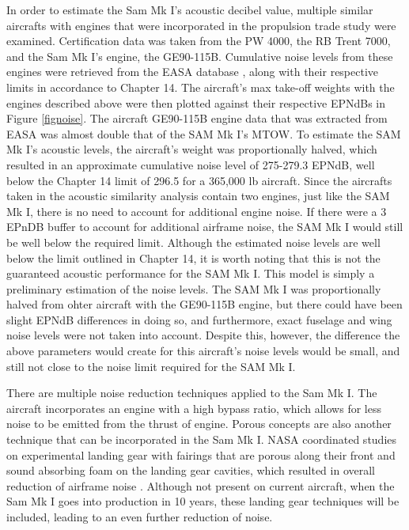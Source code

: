 In order to estimate the Sam Mk I's acoustic decibel value, multiple similar aircrafts with engines that were incorporated in the propulsion trade study were examined. Certification data was taken from the PW 4000, the RB Trent 7000, and the Sam Mk I's engine, the GE90-115B. Cumulative noise levels from these engines were retrieved from the EASA database \cite{easa}, along with their respective limits in accordance to Chapter 14. The aircraft's max take-off weights with the engines described above were then plotted against their respective EPNdBs in Figure \ref{fignoise}. The aircraft GE90-115B engine data that was extracted from EASA \cite{easa} was almost double that of the SAM Mk I's MTOW. To estimate the SAM Mk I's acoustic levels, the aircraft's weight was proportionally halved, which resulted in an approximate cumulative noise level of 275-279.3 EPNdB, well below the Chapter 14 limit of 296.5 for a 365,000 lb aircraft. Since the aircrafts taken in the acoustic similarity analysis contain two engines, just like the SAM Mk I, there is no need to account for additional engine noise. If there were a 3 EPnDB buffer to account for additional airframe noise, the SAM Mk I would still be well below the required limit. Although the estimated noise levels are well below the limit outlined in Chapter 14, it is worth noting that this is not the guaranteed acoustic performance for the SAM Mk I. This model is simply a preliminary estimation of the noise levels. The SAM Mk I was proportionally halved from ohter aircraft with the GE90-115B engine, but there could have been slight EPNdB differences in doing so, and furthermore, exact fuselage and wing noise levels were not taken into account. Despite this, however, the difference the above parameters would create for this aircraft's noise levels would be small, and still not close to the noise limit required for the SAM Mk I. 

There are multiple noise reduction techniques applied to the Sam Mk I. The aircraft incorporates an engine with a high bypass ratio, which allows for less noise to be emitted from the thrust of engine. Porous concepts are also another technique that can be incorporated in the Sam Mk I. NASA coordinated studies on experimental landing gear with fairings that are porous along their front and sound absorbing foam on the landing gear cavities, which resulted in overall reduction of airframe noise \cite{noise_reduction}. Although not present on current aircraft, when the Sam Mk I goes into production in 10 years, these landing gear techniques will be included, leading to an even further reduction of noise. 